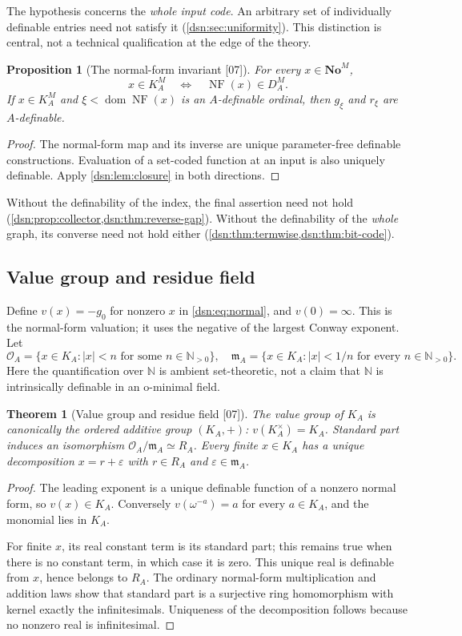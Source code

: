 \documentclass[11pt,a4paper]{article}
\numberwithin{equation}{section}
\newtheorem{theorem}{Theorem}[section]
\newtheorem{proposition}[proposition]{Proposition}
\theoremstyle{definition}
\theoremstyle{remark}
\newcommand{\No}{\mathbf{No}}
\newcommand{\N}{\mathbb N}
\newcommand{\NF}{\operatorname{NF}}
\newcommand{\dom}{\operatorname{dom}}
\newcommand{\src}[1]{\textup{\textsf{\small[#1]}}}
\begin{document}
The hypothesis concerns the \emph{whole input code}. An arbitrary set of
individually definable entries need not satisfy it
(\cref{dsn:sec:uniformity}). This distinction is central, not a technical
qualification at the edge of the theory.

\begin{proposition}[The normal-form invariant \src{07}]\label{dsn:prop:nf-invariant}
For every $x\in\No^M$,
\[
 x\in K^M_A\quad\Longleftrightarrow\quad\NF(x)\in D^M_A.
\]
If $x\in K^M_A$ and $\xi<\dom\NF(x)$ is an $A$-definable ordinal, then
$g_\xi$ and $r_\xi$ are $A$-definable.
\end{proposition}
\begin{proof}
The normal-form map and its inverse are unique parameter-free definable
constructions. Evaluation of a set-coded function at an input is also
uniquely definable. Apply \cref{dsn:lem:closure} in both directions.
\end{proof}

Without the definability of the index, the final assertion need not hold
(\cref{dsn:prop:collector,dsn:thm:reverse-gap}). Without the definability
of the \emph{whole} graph, its converse need not hold either
(\cref{dsn:thm:termwise,dsn:thm:bit-code}).

\subsection{Value group and residue field}

Define $v(x)=-g_0$ for nonzero $x$ in \eqref{dsn:eq:normal}, and
$v(0)=\infty$. This is the normal-form valuation; it uses the negative of
the largest Conway exponent. Let
\[
 \mathcal O_A=\{x\in K_A:|x|<n\text{ for some }n\in\N_{>0}\},\quad
 \mathfrak m_A=\{x\in K_A:|x|<1/n\text{ for every }n\in\N_{>0}\}.
\]
Here the quantification over $\N$ is ambient set-theoretic, not a claim
that $\N$ is intrinsically definable in an o-minimal field.

\begin{theorem}[Value group and residue field \src{07}]\label{dsn:thm:valuation}
The value group of $K_A$ is canonically the ordered additive group
$(K_A,+)$: $v(K_A^\times)=K_A$. Standard part induces an isomorphism
$\mathcal O_A/\mathfrak m_A\simeq R_A$. Every finite $x\in K_A$ has a
unique decomposition $x=r+\varepsilon$ with $r\in R_A$ and
$\varepsilon\in\mathfrak m_A$.
\end{theorem}
\begin{proof}
The leading exponent is a unique definable function of a nonzero normal
form, so $v(x)\in K_A$. Conversely $v(\omega^{-a})=a$ for every $a\in K_A$,
and the monomial lies in $K_A$.

For finite $x$, its real constant term is its standard part; this remains
true when there is no constant term, in which case it is zero. This unique
real is definable from $x$, hence belongs to $R_A$. The ordinary
normal-form multiplication and addition laws show that standard part is a
surjective ring homomorphism with kernel exactly the infinitesimals.
Uniqueness of the decomposition follows because no nonzero real is
infinitesimal.
\end{proof}
\end{document}
